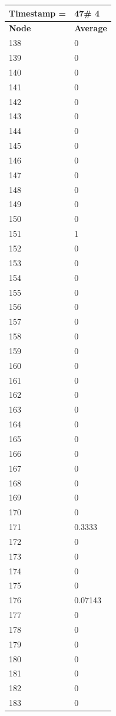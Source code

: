 \begin{tabular}{|l||l|}
\hline
\textbf{Timestamp =} & \textbf{47}\# 4\\\hline
	\textbf{Node} & \textbf{Average} \\ \hline
\hline
	138 & 0 \\ \hline
	139 & 0 \\ \hline
	140 & 0 \\ \hline
	141 & 0 \\ \hline
	142 & 0 \\ \hline
	143 & 0 \\ \hline
	144 & 0 \\ \hline
	145 & 0 \\ \hline
	146 & 0 \\ \hline
	147 & 0 \\ \hline
	148 & 0 \\ \hline
	149 & 0 \\ \hline
	150 & 0 \\ \hline
	151 & 1 \\ \hline
	152 & 0 \\ \hline
	153 & 0 \\ \hline
	154 & 0 \\ \hline
	155 & 0 \\ \hline
	156 & 0 \\ \hline
	157 & 0 \\ \hline
	158 & 0 \\ \hline
	159 & 0 \\ \hline
	160 & 0 \\ \hline
	161 & 0 \\ \hline
	162 & 0 \\ \hline
	163 & 0 \\ \hline
	164 & 0 \\ \hline
	165 & 0 \\ \hline
	166 & 0 \\ \hline
	167 & 0 \\ \hline
	168 & 0 \\ \hline
	169 & 0 \\ \hline
	170 & 0 \\ \hline
	171 & 0.3333 \\ \hline
	172 & 0 \\ \hline
	173 & 0 \\ \hline
	174 & 0 \\ \hline
	175 & 0 \\ \hline
	176 & 0.07143 \\ \hline
	177 & 0 \\ \hline
	178 & 0 \\ \hline
	179 & 0 \\ \hline
	180 & 0 \\ \hline
	181 & 0 \\ \hline
	182 & 0 \\ \hline
	183 & 0 \\ \hline
\end{tabular}
